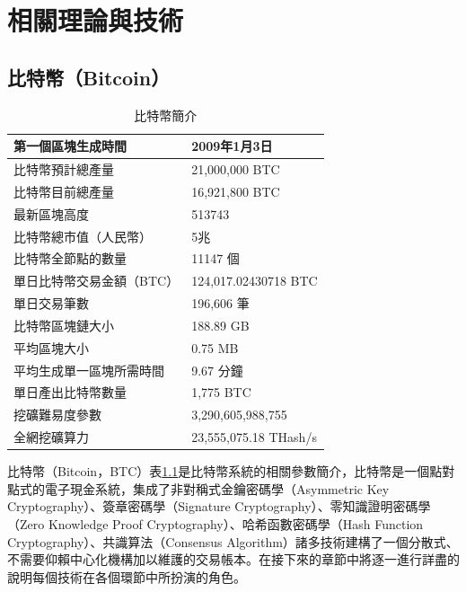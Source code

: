 
\chapter{相關理論與技術}
	
	\section{比特幣（Bitcoin）}

		\begin{table}[htbp]
		\centering
		\caption{比特幣簡介}
		\label{IntroductiontoBitcoin}
		\begin{tabular}{|l|l|}
		\hline
		第一個區塊生成時間 & 2009年1月3日 \\ \hline
		比特幣預計總產量 & 21,000,000 BTC \\ \hline
		比特幣目前總產量 & 16,921,800 BTC \\ \hline
		最新區塊高度 & 513743 \\ \hline
		比特幣總市值（人民幣） & 5兆 \\ \hline
		比特幣全節點的數量 & 11147 個 \\ \hline
		單日比特幣交易金額（BTC） & 124,017.02430718 BTC \\ \hline
		單日交易筆數 & 196,606 筆 \\ \hline
		比特幣區塊鏈大小 & 188.89 GB \\ \hline
		平均區塊大小 & 0.75 MB \\ \hline
		平均生成單一區塊所需時間 & 9.67 分鐘 \\ \hline
		單日產出比特幣數量 & 1,775 BTC \\ \hline
		挖礦難易度參數 & 3,290,605,988,755 \\ \hline
		全網挖礦算力 & 23,555,075.18 THash/s \\ \hline
		\end{tabular}
		\end{table}

		比特幣（Bitcoin，BTC）表\ref{IntroductiontoBitcoin}是比特幣系統的相關參數簡介，比特幣是一個點對點式的電子現金系統，集成了非對稱式金鑰密碼學（Asymmetric Key Cryptography）\supercite{AsymmetricKeyCryptography}、簽章密碼學（Signature Cryptography）\supercite{Apublickeycryptosystemandasignatureschemebasedondiscretelogarithms}、零知識證明密碼學（Zero Knowledge Proof Cryptography）\supercite{Zero-KnowledgeProofsofIdentity}、哈希函數密碼學（Hash Function Cryptography）、共識算法（Consensus Algorithm）\supercite{Anonymousbyzantineconsensusfrommoderately-hardpuzzles:Amodelforbitcoin}諸多技術建構了一個分散式、不需要仰賴中心化機構加以維護的交易帳本。在接下來的章節中將逐一進行詳盡的說明每個技術在各個環節中所扮演的角色。


